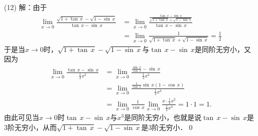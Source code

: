 \medskip
(12) 解：由于
\begin{align}
    \lim_{x \to 0} \frac{\sqrt{1+\tan \, x} - \sqrt{1-\sin \, x}}{\tan \, x - \sin \, x} &= \lim_{x \to 0} \displaystyle\frac{\displaystyle\frac{\tan \, x - \sin \, x}{\sqrt{1+\tan \, x}+\sqrt{1 - \sin \, x}}}{\tan \, x - \sin \, x} \\
    &= \lim_{x \to 0} \frac{1}{\sqrt{1+\tan \, x} + \sqrt{1- \sin \, x}} = \frac{1}{2}
\end{align}
于是当$x \to 0$时，$\sqrt{1+\tan \, x}-\sqrt{1-\sin \, x}$与$\tan \, x - \sin \, x$是同阶无穷小，又因为
\begin{align}
    \lim_{x \to 0} \frac{\tan \, x - \sin \, x}{\displaystyle\frac{1}{2}x^3} &= \lim_{x \to 0} \frac{\displaystyle\frac{\sin \, x}{\cos \, x} - \sin \, x}{\displaystyle\frac{1}{2} x^3} \\
    &= \lim_{x \to 0} \frac{\displaystyle\frac{1}{\cos \, x} \sin \, x \left(1- \cos \, x\right)}{\displaystyle\frac{1}{2}x^3} \\
    &= \lim_{x \to 0} \frac{1}{\cos \, x} \lim_{x \to 0} \frac{x \cdot \displaystyle\frac{1}{2}x^2}{\displaystyle\frac{1}{2}x^3} = 1 \cdot 1 = 1.
\end{align}
由此可见当$x \to 0$时$\tan \, x - \sin \, x$与$x^3$是同阶无穷小，也就是说$\tan \, x - \sin \, x$是$3$阶无穷小，从而$\sqrt{1+\tan \, x} - \sqrt{1 - \sin \, x}$是$3$阶无穷小．\qed

